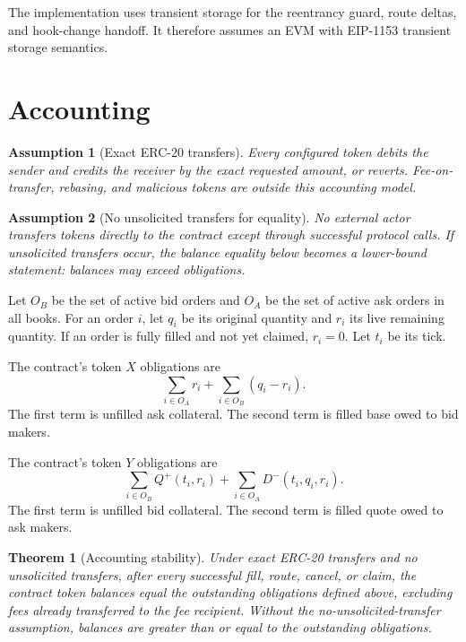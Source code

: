 \documentclass[11pt]{article}
\newtheorem{theorem}{Theorem}
\newtheorem{assumption}{Assumption}
\begin{document}
The implementation uses transient storage for the reentrancy guard,
route deltas, and hook-change handoff.  It therefore assumes an EVM with
EIP-1153 transient storage semantics.

\section{Accounting}

\begin{assumption}[Exact ERC-20 transfers]
Every configured token debits the sender and credits the receiver by the
exact requested amount, or reverts.  Fee-on-transfer, rebasing, and
malicious tokens are outside this accounting model.
\end{assumption}

\begin{assumption}[No unsolicited transfers for equality]
No external actor transfers tokens directly to the contract except
through successful protocol calls.  If unsolicited transfers occur, the
balance equality below becomes a lower-bound statement: balances may
exceed obligations.
\end{assumption}

Let \(O_B\) be the set of active bid orders and \(O_A\) be the set of
active ask orders in all books.  For an order \(i\), let \(q_i\) be its
original quantity and \(r_i\) its live remaining quantity.  If an order
is fully filled and not yet claimed, \(r_i=0\).  Let \(t_i\) be its tick.

The contract's token \(X\) obligations are
\[
  \sum_{i\in O_A} r_i
  +
  \sum_{i\in O_B} (q_i-r_i).
\]
The first term is unfilled ask collateral.  The second term is filled
base owed to bid makers.

The contract's token \(Y\) obligations are
\[
  \sum_{i\in O_B} Q^{+}(t_i,r_i)
  +
  \sum_{i\in O_A} D^{-}(t_i,q_i,r_i).
\]
The first term is unfilled bid collateral.  The second term is filled
quote owed to ask makers.

\begin{theorem}[Accounting stability]
Under exact ERC-20 transfers and no unsolicited transfers, after every
successful fill, route, cancel, or claim, the contract token balances
equal the outstanding obligations defined above, excluding fees already
transferred to the fee recipient.  Without the no-unsolicited-transfer
assumption, balances are greater than or equal to the outstanding
obligations.
\end{theorem}
\end{document}
